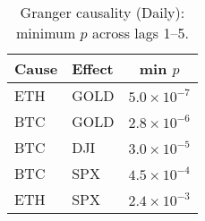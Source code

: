 \begin{table}[!ht]
  \centering
  \caption{Granger causality (Daily): minimum $p$ across lags 1--5.}
  \label{tab:granger-daily-appendix}
  \begin{tabular}{l l c}
    \toprule
    \textbf{Cause} & \textbf{Effect} & \textbf{min $p$} \\
    \midrule
    ETH & GOLD & $5.0\times10^{-7}$ \\
    BTC & GOLD & $2.8\times10^{-6}$ \\
    BTC & DJI  & $3.0\times10^{-5}$ \\
    BTC & SPX  & $4.5\times10^{-4}$ \\
    ETH & SPX  & $2.4\times10^{-3}$ \\
    \bottomrule
  \end{tabular}
\end{table}
